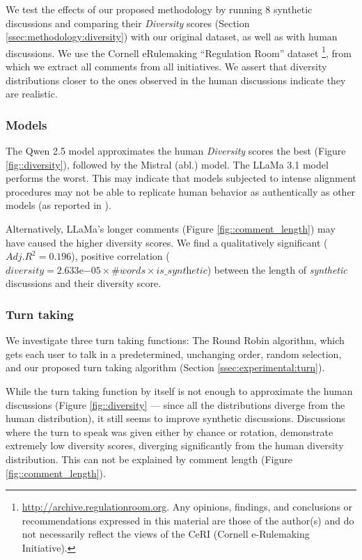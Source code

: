 We test the effects of our proposed methodology by running $8$ synthetic discussions and comparing their \textit{Diversity} scores (Section \ref{ssec:methodology:diversity}) with our original dataset, as well as with human discussions. We use the Cornell eRulemaking “Regulation Room” dataset \footnote{\url{http://archive.regulationroom.org}. Any opinions, findings, and conclusions or recommendations expressed in this material are those of the author(s) and do not necessarily reflect the views of the CeRI (Cornell e-Rulemaking Initiative).}, from which we extract all comments from all initiatives. We assert that diversity distributions closer to the ones observed in the human discussions indicate they are realistic.


\subsubsection{Models}

The Qwen 2.5 model approximates the human \textit{Diversity} scores the best (Figure \ref{fig::diversity}), followed by the Mistral (abl.) model. The LLaMa 3.1 model performs the worst. This may indicate that models subjected to intense alignment procedures may not be able to replicate human behavior as authentically as other models (as reported in \citet{Park2023GenerativeAI}). 

Alternatively, LLaMa's longer comments (Figure \ref{fig::comment_length}) may have caused the higher diversity scores. We find a qualitatively significant  ($Adj. R^2=0.196$), positive correlation ($\textit{diversity} = 2.633\mathrm{e}{-05} \times \textit{\#words} \times \textit{is\_synthetic}$) between the length of \textit{synthetic} discussions and their diversity score.


\subsubsection{Turn taking}

We investigate three turn taking functions: The Round Robin algorithm, which gets each user to talk in a predetermined, unchanging order, random selection, and our proposed turn taking algorithm (Section \ref{ssec:experimental:turn}).

While the turn taking function by itself is not enough to approximate the human discussions (Figure \ref{fig::diversity} — since all the distributions diverge from the human distribution), it still seems to improve synthetic discussions. Discussions where the turn to speak was given either by chance or rotation, demonstrate extremely low diversity scores, diverging significantly from the human diversity distribution. This can not be explained by comment length (Figure \ref{fig::comment_length}).


